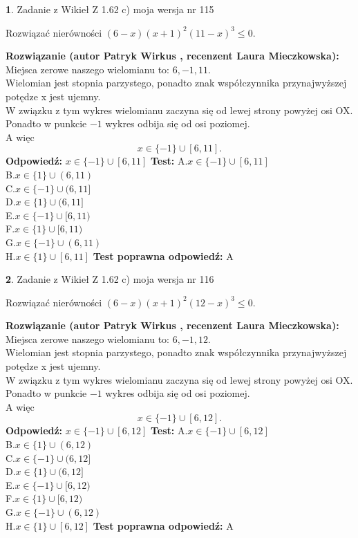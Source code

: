 \documentclass[12pt, a4paper]{article}
\theoremstyle{definition} %
\newtheorem{zad}{}
\newcommand{\zadStart}[1]{\begin{zad}#1\newline}
\newcommand{\zadStop}{\end{zad}}
\newcommand{\rozwStart}[2]{\noindent \textbf{Rozwiązanie (autor #1 , recenzent #2): }\newline}
\newcommand{\rozwStop}{\newline}
\newcommand{\odpStart}{\noindent \textbf{Odpowiedź:}\newline}
\newcommand{\odpStop}{\newline}
\newcommand{\testStart}{\noindent \textbf{Test:}\newline}
\newcommand{\testStop}{\newline}
\newcommand{\kluczStart}{\noindent \textbf{Test poprawna odpowiedź:}\newline}
\newcommand{\kluczStop}{\newline}
\begin{document}
\zadStart{Zadanie z Wikieł Z 1.62 c) moja wersja nr 115}

Rozwiązać nierówności $(6-x)(x+1)^{2}(11-x)^{3}\le0$.
\zadStop
\rozwStart{Patryk Wirkus}{Laura Mieczkowska}
Miejsca zerowe naszego wielomianu to: $6, -1, 11$.\\
Wielomian jest stopnia parzystego, ponadto znak współczynnika przy\linebreak najwyższej potędze x jest ujemny.\\ W związku z tym wykres wielomianu zaczyna się od lewej strony powyżej osi OX.\\
Ponadto w punkcie $-1$ wykres odbija się od osi poziomej.\\
A więc $$x \in \{-1\} \cup [6,11].$$
\rozwStop
\odpStart
$x \in \{-1\} \cup [6,11]$
\odpStop
\testStart
A.$x \in \{-1\} \cup [6,11]$\\
B.$x \in \{1\} \cup (6,11)$\\
C.$x \in \{-1\} \cup (6,11]$\\
D.$x \in \{1\} \cup (6,11]$\\
E.$x \in \{-1\} \cup [6,11)$\\
F.$x \in \{1\} \cup [6,11)$\\
G.$x \in \{-1\} \cup (6,11)$\\
H.$x \in \{1\} \cup [6,11]$
\testStop
\kluczStart
A
\kluczStop



\zadStart{Zadanie z Wikieł Z 1.62 c) moja wersja nr 116}

Rozwiązać nierówności $(6-x)(x+1)^{2}(12-x)^{3}\le0$.
\zadStop
\rozwStart{Patryk Wirkus}{Laura Mieczkowska}
Miejsca zerowe naszego wielomianu to: $6, -1, 12$.\\
Wielomian jest stopnia parzystego, ponadto znak współczynnika przy\linebreak najwyższej potędze x jest ujemny.\\ W związku z tym wykres wielomianu zaczyna się od lewej strony powyżej osi OX.\\
Ponadto w punkcie $-1$ wykres odbija się od osi poziomej.\\
A więc $$x \in \{-1\} \cup [6,12].$$
\rozwStop
\odpStart
$x \in \{-1\} \cup [6,12]$
\odpStop
\testStart
A.$x \in \{-1\} \cup [6,12]$\\
B.$x \in \{1\} \cup (6,12)$\\
C.$x \in \{-1\} \cup (6,12]$\\
D.$x \in \{1\} \cup (6,12]$\\
E.$x \in \{-1\} \cup [6,12)$\\
F.$x \in \{1\} \cup [6,12)$\\
G.$x \in \{-1\} \cup (6,12)$\\
H.$x \in \{1\} \cup [6,12]$
\testStop
\kluczStart
A
\kluczStop
\end{document}
